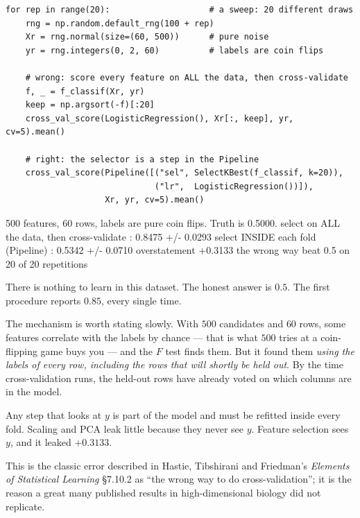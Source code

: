 \documentclass[11pt]{article}
\begin{document}
\begin{lstlisting}
for rep in range(20):                    # a sweep: 20 different draws
    rng = np.random.default_rng(100 + rep)
    Xr = rng.normal(size=(60, 500))      # pure noise
    yr = rng.integers(0, 2, 60)          # labels are coin flips

    # wrong: score every feature on ALL the data, then cross-validate
    f, _ = f_classif(Xr, yr)
    keep = np.argsort(-f)[:20]
    cross_val_score(LogisticRegression(), Xr[:, keep], yr, cv=5).mean()

    # right: the selector is a step in the Pipeline
    cross_val_score(Pipeline([("sel", SelectKBest(f_classif, k=20)),
                              ("lr",  LogisticRegression())]),
                    Xr, yr, cv=5).mean()
\end{lstlisting}
\begin{codeout}
500 features, 60 rows, labels are pure coin flips. Truth is 0.5000.
   select on ALL the data, then cross-validate : 0.8475  +/- 0.0293
   select INSIDE each fold (Pipeline)          : 0.5342  +/- 0.0710
   overstatement                                +0.3133
   the wrong way beat 0.5 on 20 of 20 repetitions
\end{codeout}

There is nothing to learn in this dataset. The honest answer is $0.5$. The
first procedure reports $0.85$, every single time.

The mechanism is worth stating slowly. With $500$ candidates and $60$ rows,
some features correlate with the labels by chance --- that is what $500$ tries
at a coin-flipping game buys you --- and the $F$ test finds them. But it found
them \emph{using the labels of every row, including the rows that will shortly
be held out}. By the time cross-validation runs, the held-out rows have already
voted on which columns are in the model.

\begin{keyidea}
Any step that looks at $y$ is part of the model and must be refitted inside
every fold. Scaling and PCA leak little because they never see $y$. Feature
selection sees $y$, and it leaked $+0.3133$.
\end{keyidea}

This is the classic error described in Hastie, Tibshirani and Friedman's
\emph{Elements of Statistical Learning} \S7.10.2 as ``the wrong way to do
cross-validation''; it is the reason a great many published results in
high-dimensional biology did not replicate.
\end{document}
